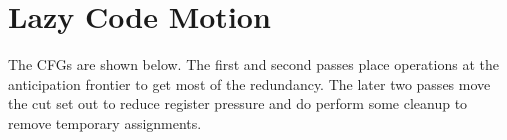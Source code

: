 \section{Lazy Code Motion}
  
The CFGs are shown below. The first and second passes place operations
at the anticipation frontier to get most of the redundancy.
The later two passes move the cut set out to reduce register pressure and
do perform some cleanup to remove temporary assignments.



